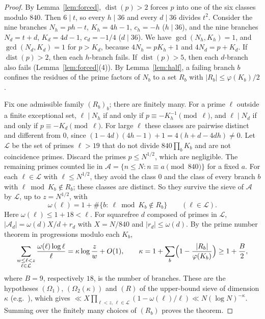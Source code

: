 \documentclass[11pt,reqno]{amsart}
\theoremstyle{definition}
\newcommand{\dist}{\operatorname{dist}}
\begin{document}
\begin{proof}
By Lemma~\ref{lem:forced}, $\dist(p)>2$ forces $p$ into one of the six
classes modulo $840$.  Then $6\mid t$, so every $h\mid36$ and every
$d\mid36$ divides $t^2$.  Consider the nine branches $N_h=ph-t$,
$K_h=4h-1$, $c_h=-h$ ($h\mid36$), and the nine branches $N_d=t+d$,
$K_d=4d-1$, $c_d=-1/4$ ($d\mid36$).  We have $\gcd(N_h,K_h)=1$, and
$\gcd(N_d,K_d)=1$ for $p>K_d$, because $4N_h=pK_h+1$ and $4N_d=p+K_d$.  If
$\dist(p)>2$, then each $h$-branch fails.  If $\dist(p)>5$, then each
$d$-branch also fails (Lemma~\ref{lem:forced}(4)).  By
Lemma~\ref{lem:half}, a failing branch $b$ confines the residues of the
prime factors of $N_b$ to a set $R_b$ with $|R_b|\le\varphi(K_b)/2$.

Fix one admissible family $(R_b)_b$; there are finitely many.  For a prime
$\ell$ outside a finite exceptional set, $\ell\mid N_h$ if and only if
$p\equiv-K_h^{-1}\pmod\ell$, and $\ell\mid N_d$ if and only if
$p\equiv-K_d\pmod\ell$.  For large $\ell$ these classes are pairwise
distinct and different from $0$, since $(1-4d)(4h-1)+1=4(h+d-4dh)\ne0$.
Let $\mathcal L$ be the set of primes $\ell>19$ that do not divide
$840\prod_bK_b$ and are not coincidence primes.  Discard the primes
$p\le N^{1/2}$, which are negligible.  The remaining primes counted lie in
$\mathcal A=\{n\le N:n\equiv a\pmod{840}\}$ for a fixed $a$.  For each
$\ell\in\mathcal L$ with $\ell\le N^{1/2}$, they avoid the class $0$ and the
class of every branch $b$ with $\ell\bmod K_b\notin R_b$; these classes are
distinct.  So they survive the sieve of $\mathcal A$ by $\mathcal L$, up to
$z=N^{1/2}$, with
\[
 \omega(\ell)=1+\#\{b:\ \ell\bmod K_b\notin R_b\}\qquad(\ell\in\mathcal L).
\]
Here $\omega(\ell)\le1+18<\ell$.  For squarefree $d$ composed of primes in
$\mathcal L$, $|\mathcal A_d|=\omega(d)X/d+r_d$ with $X=N/840$ and
$|r_d|\le\omega(d)$.  By the prime number theorem in progressions modulo
each $K_b$,
\[
 \sum_{\substack{w\le\ell<z\\ \ell\in\mathcal L}}\frac{\omega(\ell)\log\ell}{\ell}
 =\kappa\log\frac zw+O(1),\qquad
 \kappa=1+\sum_b\Bigl(1-\frac{|R_b|}{\varphi(K_b)}\Bigr)\ge1+\frac B2 ,
\]
where $B=9$, respectively $18$, is the number of branches.  These are the
hypotheses $(\Omega_1)$, $(\Omega_2(\kappa))$ and $(R)$ of the upper-bound
sieve of dimension $\kappa$ (e.g.\ \cite[Thm.~2.2]{HR}), which gives
$\ll X\prod_{\ell<z,\,\ell\in\mathcal L}(1-\omega(\ell)/\ell)\ll
N(\log N)^{-\kappa}$.  Summing over the finitely many choices of $(R_b)$
proves the theorem.
\end{proof}
\end{document}
